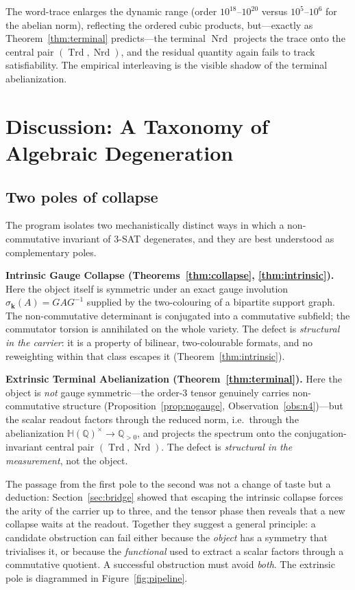 \documentclass[pdflatex,sn-mathphys-num]{sn-jnl}
\theoremstyle{thmstyleone}%
\theoremstyle{thmstyletwo}%
\theoremstyle{thmstylethree}%
\newcommand{\HH}{\mathbb{H}}
\newcommand{\QQ}{\mathbb{Q}}
\newcommand{\Nrd}{\operatorname{Nrd}}
\newcommand{\Trd}{\operatorname{Trd}}
\newcommand{\bk}{\mathbf{k}}
\begin{document}
The word-trace enlarges the dynamic range (order $10^{18}$--$10^{20}$ versus
$10^5$--$10^6$ for the abelian norm), reflecting the ordered cubic products,
but---exactly as Theorem~\ref{thm:terminal} predicts---the terminal $\Nrd$
projects the trace onto the central pair $(\Trd,\Nrd)$, and the residual
quantity again fails to track satisfiability. The empirical interleaving is
the visible shadow of the terminal abelianization.

\section{Discussion: A Taxonomy of Algebraic Degeneration}
\label{sec:discussion}

\subsection{Two poles of collapse}

The program isolates two mechanistically distinct ways in which a
non-commutative invariant of $3$-SAT degenerates, and they are best
understood as complementary poles.

\medskip
\noindent\textbf{Intrinsic Gauge Collapse (Theorems~\ref{thm:collapse},
\ref{thm:intrinsic}).} Here the object itself is symmetric under an exact
gauge involution $\sigma_{\bk}(A)=GAG^{-1}$ supplied by the two-colouring of
a bipartite support graph. The non-commutative determinant is conjugated
into a commutative subfield; the commutator torsion is annihilated on the
whole variety. The defect is \emph{structural in the carrier}: it is a
property of bilinear, two-colourable formats, and no reweighting within that
class escapes it (Theorem~\ref{thm:intrinsic}).

\medskip
\noindent\textbf{Extrinsic Terminal Abelianization
(Theorem~\ref{thm:terminal}).} Here the object is \emph{not} gauge
symmetric---the order-$3$ tensor genuinely carries non-commutative
structure (Proposition~\ref{prop:nogauge}, Observation~\ref{obs:n4})---but
the scalar readout factors through the reduced norm, i.e.\ through the
abelianization $\HH(\QQ)^{\times}\to\QQ_{>0}$, and projects the spectrum onto
the conjugation-invariant central pair $(\Trd,\Nrd)$. The defect is
\emph{structural in the measurement}, not the object.

\medskip

The passage from the first pole to the second was not a change of taste but
a deduction: Section~\ref{sec:bridge} showed that escaping the intrinsic
collapse forces the arity of the carrier up to three, and the tensor phase
then reveals that a new collapse waits at the readout. Together they suggest
a general principle: a candidate obstruction can fail either because the
\emph{object} has a symmetry that trivialises it, or because the
\emph{functional} used to extract a scalar factors through a commutative
quotient. A successful obstruction must avoid \emph{both}. The extrinsic
pole is diagrammed in Figure~\ref{fig:pipeline}.
\end{document}
